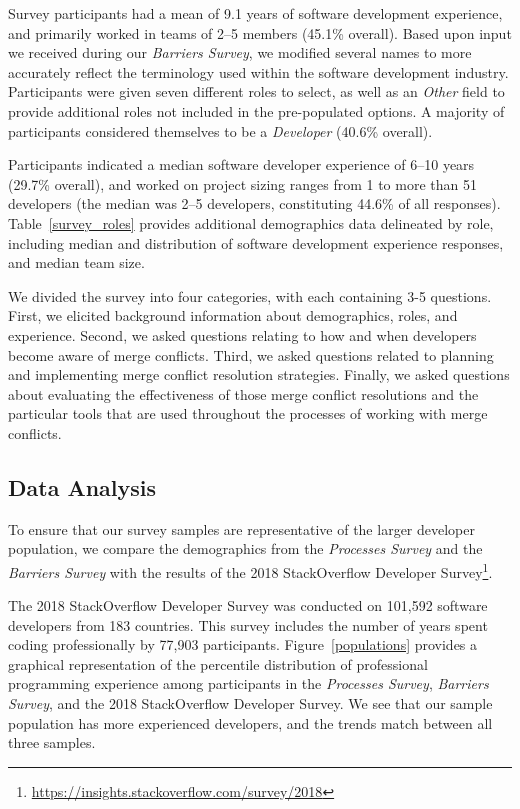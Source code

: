 Survey participants had a mean of 9.1 years of software development experience, and primarily worked in teams of 2--5 members (45.1\% overall).
Based upon input we received during our \textit{Barriers Survey}, we modified several names to more accurately reflect the terminology used within the software development industry.
Participants were given seven different roles to select, as well as an \textit{Other} field to provide additional roles not included in the pre-populated options.
A majority of participants considered themselves to be a \textit{Developer} (40.6\% overall).

Participants indicated a median software developer experience of 6--10 years (29.7\% overall), and worked on project sizing ranges from 1 to more than 51 developers (the median was 2--5 developers, constituting 44.6\% of all responses).
Table~\ref{survey_roles} provides additional demographics data delineated by role, including median and distribution of software development experience responses, and median team size.

We divided the survey into four categories, with each containing 3-5 questions.
First, we elicited background information about demographics, roles, and experience.
Second, we asked questions relating to how and when developers become aware of merge conflicts.
Third, we asked questions related to planning and implementing merge conflict resolution strategies.
Finally, we asked questions about evaluating the effectiveness of those merge conflict resolutions and the particular tools that are used throughout the processes of working with merge conflicts.

\subsection{Data Analysis}\label{analysis}
To ensure that our survey samples are representative of the larger developer population, we compare the demographics from the \textit{Processes Survey} and the \textit{Barriers Survey} with the results of the 2018 StackOverflow Developer Survey\footnote{\url{https://insights.stackoverflow.com/survey/2018}}.

The 2018 StackOverflow Developer Survey was conducted on 101,592 software developers from 183 countries.
This survey includes the number of years spent coding professionally by 77,903 participants.
Figure~\ref{populations} provides a graphical representation of the percentile distribution of professional programming experience among participants in the \textit{Processes Survey}, \textit{Barriers Survey}, and the 2018 StackOverflow Developer Survey.
We see that our sample population has more experienced developers, and the trends match between all three samples.

